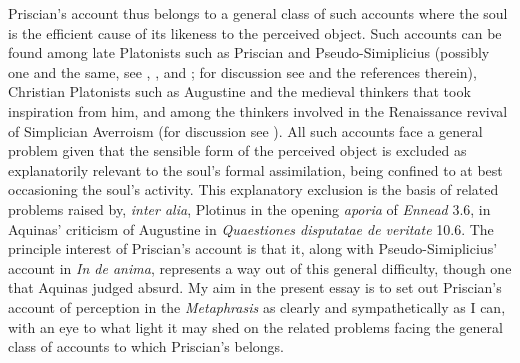\documentclass[12pt]{article}
\begin{document}
Priscian's account thus belongs to a general class of such accounts where the soul is the efficient cause of its likeness to the perceived object. Such accounts can be found among late Platonists such as Priscian and Pseudo-Simiplicius (possibly one and the same, see \citealt{Bossier:1972rp}, \citealt{Steel:1978th}, and \citealt[103--140]{Sorabji:1997ly}; for discussion see \citealt[18-24]{Finamore:2002yf} and the references therein), Christian Platonists such as Augustine and the medieval thinkers that took inspiration from him, and among the thinkers involved in the Renaissance revival of Simplician Averroism (for discussion see \citealt[chapter 8]{Spruit:1995fh}). All such accounts face a general problem given that the sensible form of the perceived object is excluded as explanatorily relevant to the soul's formal assimilation, being confined to at best occasioning the soul's activity. This explanatory exclusion is the basis of related problems raised by, \emph{inter alia}, Plotinus in the opening \emph{aporia} of \emph{Ennead} 3.6, in Aquinas' criticism of Augustine in \emph{Quaestiones disputatae de veritate} 10.6. The principle interest of Priscian's account is that it, along with Pseudo-Simiplicius' account in \emph{In de anima}, represents a way out of this general difficulty, though one that Aquinas judged absurd. My aim in the present essay is to set out Priscian's account of perception in the \emph{Metaphrasis} as clearly and sympathetically as I can, with an eye to what light it may shed on the related problems facing the general class of accounts to which Priscian's belongs.



\end{document}
